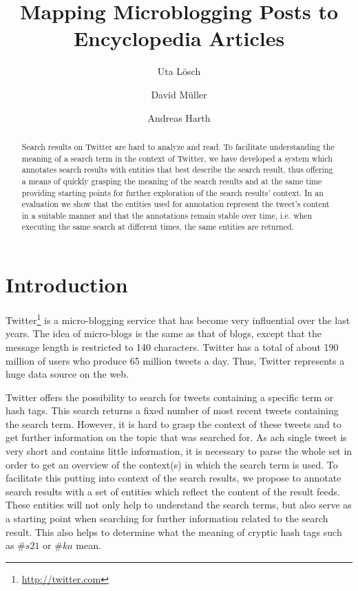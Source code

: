\documentclass{llncs}
\title{Mapping Microblogging Posts to Encyclopedia Articles}
\author{Uta L\"{o}sch \and David M\"{u}ller \and Andreas Harth}
\institute{
	Karlsruhe Institute of Technology (KIT), D-76131 Karlsruhe, Germany\\ 
	\email{uta.loesch@kit.edu},\\
	\email{david.mueller@student.kit.edu},\\
	\email{harth@kit.edu}
}
\begin{document}
\maketitle

\begin{abstract}
Search results on Twitter are hard to analyze and read. To facilitate understanding the meaning of a search term in the context of Twitter, we have developed a system which annotates search results with entities that best describe the search result, thus offering a means of quickly grasping the meaning of the search results and at the same time providing starting points for further exploration of the search results' context. In an evaluation we show that the entities used for annotation represent the tweet's content in a suitable manner and that the annotations remain stable over time, i.e. when executing the same search at different times, the same entities are returned.
\end{abstract}

\section{Introduction}

Twitter\footnote{\url{http://twitter.com}} is a micro-blogging service that has become very influential over the last years. The idea of micro-blogs is the same as that of blogs, except that the message length is restricted to 140 characters. Twitter has a total of about 190 million of users who produce 65 million tweets a day. Thus, Twitter represents a huge data source on the web.

Twitter offers the possibility to search for tweets containing a specific term or hash tags. This search returns a fixed number of most recent tweets containing the search term. However, it is hard to grasp the context of these tweets and to get further information on the topic that was searched for. As ach single tweet is very short and contains little information, it is necessary to parse the whole set in order to get an overview of the context(s) in which the search term is used. To facilitate this putting into context of the search results, we propose to annotate search results with a set of entities which reflect the content of the result feeds. These entities will not only help to understand the search terms, but also serve as a starting point when searching for further information related to the search result. This also helps to determine what the meaning of cryptic hash tags such as $\#s21$ or $\#ka$ mean. 
\end{document}
